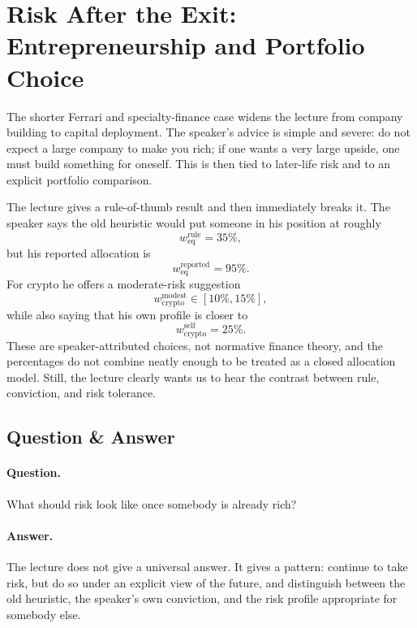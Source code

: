 \section{Risk After the Exit: Entrepreneurship and Portfolio Choice}

The shorter Ferrari and specialty-finance case widens the lecture from company building to capital deployment. The speaker's advice is simple and severe: do not expect a large company to make you rich; if one wants a very large upside, one must build something for oneself. This is then tied to later-life risk and to an explicit portfolio comparison.

The lecture gives a rule-of-thumb result and then immediately breaks it. The speaker says the old heuristic would put someone in his position at roughly
\begin{equation}
w_{\mathrm{eq}}^{\mathrm{rule}}=35\%,
\end{equation}
but his reported allocation is
\begin{equation}
w_{\mathrm{eq}}^{\mathrm{reported}}=95\%.
\end{equation}
For crypto he offers a moderate-risk suggestion
\begin{equation}
w_{\mathrm{crypto}}^{\mathrm{modest}}\in[10\%,15\%],
\end{equation}
while also saying that his own profile is closer to
\begin{equation}
w_{\mathrm{crypto}}^{\mathrm{self}}=25\%.
\end{equation}
These are speaker-attributed choices, not normative finance theory, and the percentages do not combine neatly enough to be treated as a closed allocation model. Still, the lecture clearly wants us to hear the contrast between rule, conviction, and risk tolerance.

\subsection{Question \& Answer}

\paragraph{Question.} What should risk look like once somebody is already rich?

\paragraph{Answer.} The lecture does not give a universal answer. It gives a pattern: continue to take risk, but do so under an explicit view of the future, and distinguish between the old heuristic, the speaker's own conviction, and the risk profile appropriate for somebody else.

